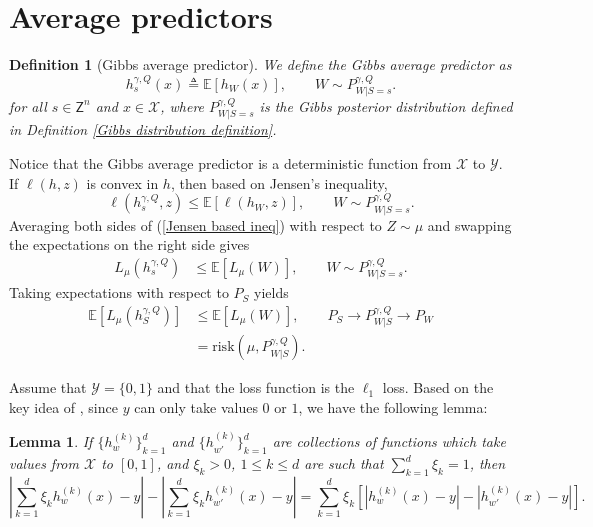 \documentclass{article}
\newtheorem{definition}{Definition}
\newtheorem{lemma}{Lemma}
\newcommand{\E}{\mathbb{E}}
\newcommand{\X}{\mathcal{X}}
\newcommand{\risk}[0]{\mathrm{risk}}
\newcommand{\Z}[0]{\mathsf{Z}}
\begin{document}
\section{Average predictors}\label{Gibbs average predictors}
\begin{definition}[Gibbs average predictor] We define the Gibbs average predictor as
\begin{equation}\nonumber
	h^{\gamma, Q}_s(x)\triangleq \E[h_W(x)], \qquad W\sim P^{\gamma, Q}_{W|S=s}.
\end{equation}
for all $s\in \Z^n$ and $x\in \X$, where $P^{\gamma, Q}_{W|S=s}$ is the Gibbs posterior distribution defined in Definition \ref{Gibbs distribution definition}. 
\end{definition}
Notice that the Gibbs average predictor is a deterministic function from $\X$ to $\mathcal{Y}$.
If $\ell(h,z)$ is convex in $h$, then based on Jensen's inequality,
\begin{equation}\label{Jensen based ineq}
	\ell(h^{\gamma,Q}_s,z)\leq \E[\ell(h_W,z)], \qquad W\sim P^{\gamma, Q}_{W|S=s}.
\end{equation}
Averaging both sides of (\ref{Jensen based ineq}) with respect to $Z\sim \mu$ and swapping the expectations on the right side gives
\begin{align}
	L_{\mu}\left(h^{\gamma,Q}_s\right)&\leq \E[L_{\mu}(W)], \qquad W\sim P^{\gamma, Q}_{W|S=s}.\nonumber
\end{align}
Taking expectations with respect to $P_S$ yields
\begin{align}
	\E \left[L_{\mu}\left(h^{\gamma,Q}_S\right)\right]&\leq \E[L_{\mu}(W)], \qquad P_S\to P^{\gamma, Q}_{W|S}\to P_W \nonumber\\
	&=\risk\left(\mu, P^{\gamma, Q}_{W|S} \right). \label{average Gibbs to Gibbs distribution}
\end{align}

Assume that $\mathcal{Y}=\{0,1\}$ and that the loss function is the $\ell_1$ loss. Based on the key idea of \cite[Equation (4.3)]{cesa1999prediction}, since $y$ can only take values $0$ or $1$, we have the following lemma:

\begin{lemma}
	If $\{h_w^{(k)}\}_{k=1}^d$ and $\{h_{w'}^{(k)}\}_{k=1}^d$ are collections of functions which take values from $\X$ to $[0,1]$, and $\xi_k>0$, $1\leq k\leq d$ are such that $\sum_{k=1}^d\xi_k=1$, then 
	\begin{equation}\label{absolute value loss identity}
	\left|\sum_{k=1}^d \xi_k h^{(k)}_w(x)-y\right|-\left|\sum_{k=1}^d \xi_k h^{(k)}_{w'}(x)-y \right|=\sum_{k=1}^d \xi_k \left[\left|h^{(k)}_w(x)-y\right|-\left|h^{(k)}_{w'}(x)-y\right|\right].
\end{equation}
\end{lemma}
\end{document}
